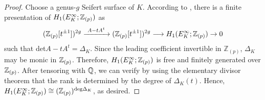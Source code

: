 \documentclass{article}
\theoremstyle{plain}
\theoremstyle{definition}
\newcommand{\lra}{\longrightarrow}
\newcommand{\ra}{\rightarrow}
\newcommand{\Q}{{\Bbb Q}}
\newcommand{\Z}{{\Bbb Z}}
\begin{document}
{\begin{proof}
Choose a genus-$g$ Seifert surface of $K$. According to \cite[Theorem 6.5]{Lic}, there is a finite presentation of $H_1(E_K^{\infty} ;\Z_{(p)}) $ as
\[ (\Z_{(p)}[t^{\pm 1} ])^{2g} \xrightarrow{\ A-tA^t \ } (\Z_{(p)}[t^{\pm 1} ])^{2g} \lra H_1(E_K^{\infty} ;\Z_{(p)}) \ra 0 \]
such that det$A-tA^t = \Delta_K $. Since the leading coefficient invertible in $\mathbb Z_{(p)}$, $\Delta_K $ may be monic in $\Z_{(p)}$. Therefore, $H_1(E_K^{\infty} ;\Z_{(p)}) $ is free and finitely generated over $\Z_{(p)} $. After tensoring with $\Q$, we can verify by using the elementary divisor theorem that the rank is determined by the degree of $\Delta_K(t) $. Hence, $H_1(E_K^{\infty} ;\Z_{(p)}) \cong ( \Z_{(p)})^{\mathrm{deg}\Delta_K} $, as desired.
\end{proof}

}
\end{document}
